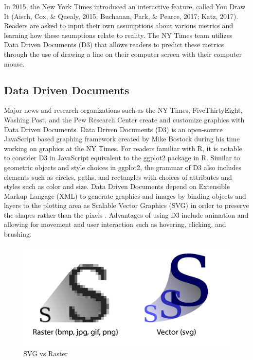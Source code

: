 \documentclass[print]{nuthesis}
\begin{document}
In 2015, the New York Times introduced an interactive feature, called You Draw It (Aisch, Cox, \& Quealy, 2015; Buchanan, Park, \& Pearce, 2017; Katz, 2017).
Readers are asked to input their own assumptions about various metrics and learning how these asumptions relate to reality.
The NY Times team utilizes Data Driven Documents (D3) that allows readers to predict these metrics through the use of drawing a line on their computer screen with their computer mouse.

\hypertarget{data-driven-documents}{%
\subsection{Data Driven Documents}\label{data-driven-documents}}

Major news and research organizations such as the NY Times, FiveThirtyEight, Washing Post, and the Pew Research Center create and customize graphics with Data Driven Documents.
Data Driven Documents (D3) is an open-source JavaScript based graphing framework created by Mike Bostock during his time working on graphics at the NY Times.
For readers familiar with R, it is notable to consider D3 in JavaScript equivalent to the ggplot2 package in R.
Similar to geometric objects and style choices in ggplot2, the grammar of D3 also includes elements such as circles, paths, and rectangles with choices of attributes and styles such as color and size.
Data Driven Documents depend on Extensible Markup Langage (XML) to generate graphics and images by binding objects and layers to the plotting area as Scalable Vector Graphics (SVG) in order to preserve the shapes rather than the pixels  .
Advantages of using D3 include animation and allowing for movement and user interaction such as hovering, clicking, and brushing.

\begin{figure}[tbp]

{\centering \includegraphics[width=0.75\linewidth,]{images/raster-vs-vector} 

}

\caption{SVG vs Raster}\label{fig:raster-vs-vector}
\end{figure}
\end{document}
